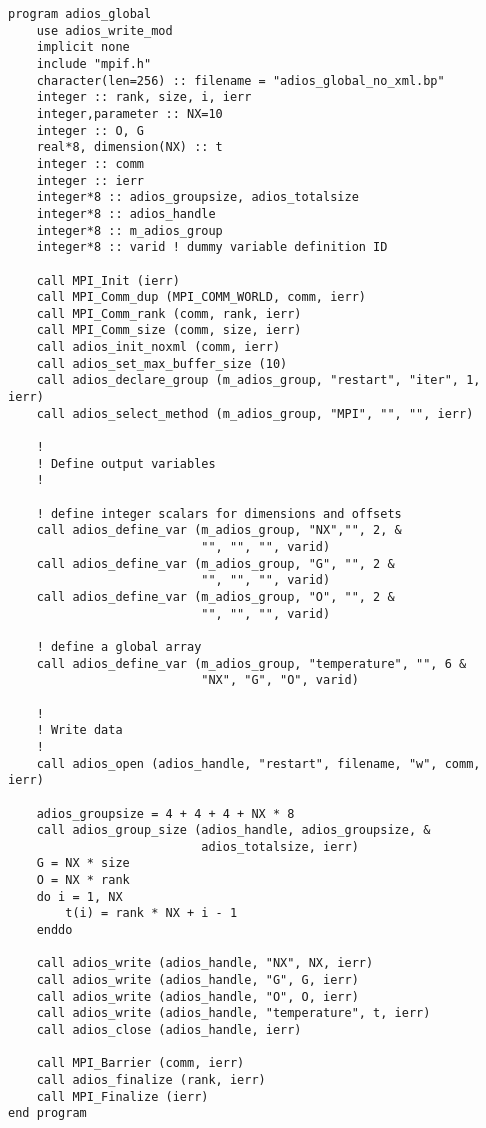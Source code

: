 \begin{lstlisting}[alsolanguage=Fortran,caption={ADIOS no-XML example},label={}]
program adios_global 
    use adios_write_mod
    implicit none
    include "mpif.h"
    character(len=256) :: filename = "adios_global_no_xml.bp" 
    integer :: rank, size, i, ierr
    integer,parameter :: NX=10
    integer :: O, G    
    real*8, dimension(NX) :: t 
    integer :: comm
    integer :: ierr
    integer*8 :: adios_groupsize, adios_totalsize
    integer*8 :: adios_handle
    integer*8 :: m_adios_group
    integer*8 :: varid ! dummy variable definition ID

    call MPI_Init (ierr)
    call MPI_Comm_dup (MPI_COMM_WORLD, comm, ierr)
    call MPI_Comm_rank (comm, rank, ierr) 
    call MPI_Comm_size (comm, size, ierr)
    call adios_init_noxml (comm, ierr)
    call adios_set_max_buffer_size (10)
    call adios_declare_group (m_adios_group, "restart", "iter", 1, ierr) 
    call adios_select_method (m_adios_group, "MPI", "", "", ierr)
    
    !
    ! Define output variables
    !

    ! define integer scalars for dimensions and offsets
    call adios_define_var (m_adios_group, "NX","", 2, &
                           "", "", "", varid) 
    call adios_define_var (m_adios_group, "G", "", 2 &
                           "", "", "", varid) 
    call adios_define_var (m_adios_group, "O", "", 2 &
                           "", "", "", varid)
        
    ! define a global array
    call adios_define_var (m_adios_group, "temperature", "", 6 &
                           "NX", "G", "O", varid)

    !
    ! Write data 
    !
    call adios_open (adios_handle, "restart", filename, "w", comm, ierr)
    
    adios_groupsize = 4 + 4 + 4 + NX * 8
    call adios_group_size (adios_handle, adios_groupsize, &
                           adios_totalsize, ierr)
    G = NX * size 
    O = NX * rank 
    do i = 1, NX
        t(i) = rank * NX + i - 1 
    enddo
    
    call adios_write (adios_handle, "NX", NX, ierr)
    call adios_write (adios_handle, "G", G, ierr)
    call adios_write (adios_handle, "O", O, ierr)
    call adios_write (adios_handle, "temperature", t, ierr)
    call adios_close (adios_handle, ierr) 

    call MPI_Barrier (comm, ierr)
    call adios_finalize (rank, ierr)
    call MPI_Finalize (ierr) 
end program
\end{lstlisting}


